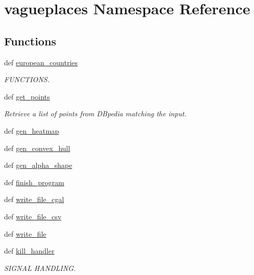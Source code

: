 \hypertarget{namespacevagueplaces}{\section{vagueplaces \-Namespace \-Reference}
\label{namespacevagueplaces}
}
\subsection*{\-Functions}
\begin{DoxyCompactItemize}
\item 
def \hyperlink{namespacevagueplaces_adec54b9e74dc2de30d17a2fe161f137c}{european\-\_\-countries}
\begin{DoxyCompactList}\small\item\em \-F\-U\-N\-C\-T\-I\-O\-N\-S. \end{DoxyCompactList}\item 
def \hyperlink{namespacevagueplaces_aed235c5c580e7ab436215ad07be55b27}{get\-\_\-points}
\begin{DoxyCompactList}\small\item\em \-Retrieve a list of points from \-D\-Bpedia matching the input. \end{DoxyCompactList}\item 
def \hyperlink{namespacevagueplaces_a085e07955df048db8ed1621669a4a064}{gen\-\_\-heatmap}
\item 
def \hyperlink{namespacevagueplaces_abace2d9a58e6249fea81bb4163cd9ef6}{gen\-\_\-convex\-\_\-hull}
\item 
def \hyperlink{namespacevagueplaces_a97ab699f1b7ffdaf4b86a2342cc1bdc3}{gen\-\_\-alpha\-\_\-shape}
\item 
def \hyperlink{namespacevagueplaces_a8384e83cc2817ccd5697611b911be2e5}{finish\-\_\-program}
\item 
def \hyperlink{namespacevagueplaces_a31c6bc6970f61bd314e35668a15bfa6f}{write\-\_\-file\-\_\-cgal}
\item 
def \hyperlink{namespacevagueplaces_a82d499b2844c4caf6e3d29e242edd1d8}{write\-\_\-file\-\_\-csv}
\item 
def \hyperlink{namespacevagueplaces_aaebf90c401271b3c8426734be3676964}{write\-\_\-file}
\item 
def \hyperlink{namespacevagueplaces_ae8bd8113632ad176c928b0b2871460c4}{kill\-\_\-handler}
\begin{DoxyCompactList}\small\item\em \-S\-I\-G\-N\-A\-L \-H\-A\-N\-D\-L\-I\-N\-G. \end{DoxyCompactList}\end{DoxyCompactItemize}
